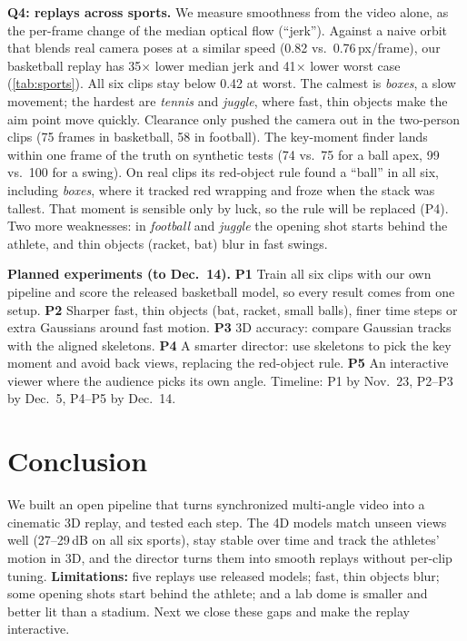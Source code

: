 \documentclass[10pt,twocolumn,letterpaper]{article}
\newcommand{\dB}{\,dB\xspace}
\begin{document}
\noindent\textbf{Q4: replays across sports.} We measure smoothness from the video alone, as the per-frame change of the median optical flow (``jerk''). Against a naive orbit that blends real camera poses at a similar speed (0.82 vs.\ 0.76\,px/frame), our basketball replay has 35$\times$ lower median jerk and 41$\times$ lower worst case (\cref{tab:sports}). All six clips stay below 0.42 at worst. The calmest is \emph{boxes}, a slow movement; the hardest are \emph{tennis} and \emph{juggle}, where fast, thin objects make the aim point move quickly. Clearance only pushed the camera out in the two-person clips (75 frames in basketball, 58 in football). The key-moment finder lands within one frame of the truth on synthetic tests (74 vs.\ 75 for a ball apex, 99 vs.\ 100 for a swing). On real clips its red-object rule found a ``ball'' in all six, including \emph{boxes}, where it tracked red wrapping and froze when the stack was tallest. That moment is sensible only by luck, so the rule will be replaced (P4). Two more weaknesses: in \emph{football} and \emph{juggle} the opening shot starts behind the athlete, and thin objects (racket, bat) blur in fast swings.

\noindent\textbf{Planned experiments (to Dec.\ 14).} \textbf{P1} Train all six clips with our own pipeline and score the released basketball model, so every result comes from one setup. \textbf{P2} Sharper fast, thin objects (bat, racket, small balls), \eg finer time steps or extra Gaussians around fast motion. \textbf{P3} 3D accuracy: compare Gaussian tracks with the aligned skeletons. \textbf{P4} A smarter director: use skeletons to pick the key moment and avoid back views, replacing the red-object rule. \textbf{P5} An interactive viewer where the audience picks its own angle. Timeline: P1 by Nov.\ 23, P2--P3 by Dec.\ 5, P4--P5 by Dec.\ 14.

\section{Conclusion}
\label{sec:conclusion}

We built an open pipeline that turns synchronized multi-angle video into a cinematic 3D replay, and tested each step. The 4D models match unseen views well (27--29\dB on all six sports), stay stable over time and track the athletes' motion in 3D, and the director turns them into smooth replays without per-clip tuning. \textbf{Limitations:} five replays use released models; fast, thin objects blur; some opening shots start behind the athlete; and a lab dome is smaller and better lit than a stadium. Next we close these gaps and make the replay interactive.

{\small


}
\end{document}
